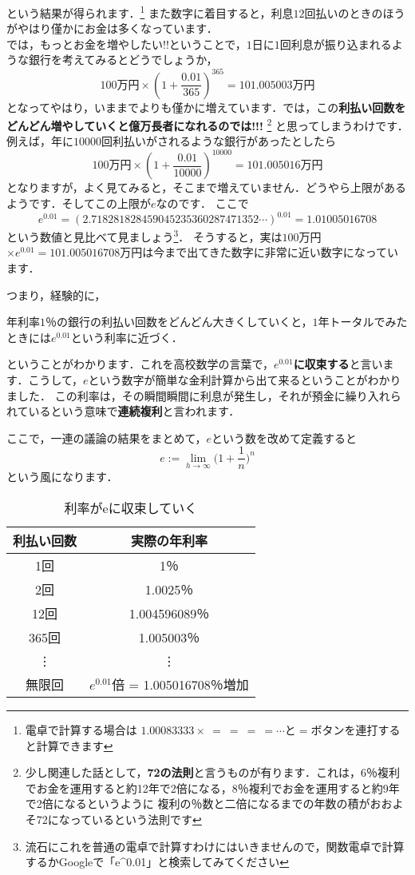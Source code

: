 という結果が得られます．\footnote{電卓で計算する場合は $1.00083333 \times\  = \ = \ = \ = \dotsb $と$=$ボタンを連打すると計算できます}
また数字に着目すると，利息$12$回払いのときのほうがやはり僅かにお金は多くなっています．\\
では，もっとお金を増やしたい!!ということで，$1$日に$1$回利息が振り込まれるような銀行を考えてみるとどうでしょうか，
\[
100\mbox{万円}\times \left(1 + \frac{0.01}{365}\right)^{365} = 101.005003 \mbox{万円}
\]
となってやはり，いままでよりも僅かに増えています．では，この\textbf{利払い回数をどんどん増やしていくと億万長者になれるのでは!!!}
\footnote{少し関連した話として，\textbf{72の法則}と言うものが有ります．これは，6％複利でお金を運用すると約12年で2倍になる，8％複利でお金を運用すると約9年で2倍になるというように
複利の％数と二倍になるまでの年数の積がおおよそ72になっているという法則です}
と思ってしまうわけです．例えば，年に$10000$回利払いがされるような銀行があったとしたら
\[
100\mbox{万円}\times \left(1 + \frac{0.01}{10000}\right)^{10000} = 101.005016 \mbox{万円}
\]
となりますが，よく見てみると，そこまで増えていません．どうやら上限があるようです．そしてこの上限が$e$なのです．
ここで
\[
e^{0.01} = (2.718281828459045235360287471352 \cdots )^{0.01} = 1.01005016708
\]
という数値と見比べて見ましょう\footnote{流石にこれを普通の電卓で計算すわけにはいきませんので，関数電卓で計算するかGoogleで「e\^{}0.01」と検索してみてください}．
そうすると，実は$100$万円$\times e^{0.01} =  101.005016708$万円は今まで出てきた数字に非常に近い数字になっています．

つまり，経験的に，
\begin{center}
年利率$1$％の銀行の利払い回数をどんどん大きくしていくと，$1$年トータルでみたときには$e^{0.01}$という利率に近づく．
\end{center}
ということがわかります．これを高校数学の言葉で，\textbf{$e^{0.01}$に収束する}と言います．こうして，$e$という数字が簡単な金利計算から出て来るということがわかりました．
この利率は，その瞬間瞬間に利息が発生し，それが預金に繰り入れられているという意味で\textbf{連続複利}と言われます．

ここで，一連の議論の結果をまとめて，$e$という数を改めて定義すると
\[
e := \lim_{h \to \infty} \biggl( 1 + \frac{1}{n}\biggl)^n
\]
という風になります．
\begin{table}[hbtp]
  \caption{利率がeに収束していく}
  \label{table:data_type}
  \centering
  \begin{tabular}{c|c}
    \hline
    利払い回数  & 実際の年利率  \\
    \hline \hline
    1回  & 1％ \\
    2回  & 1.0025％ \\
    12回  & 1.004596089％ \\
    365回  &  1.005003％\\
	\vdots & \vdots \\
	無限回 & $e^{0.01}$倍 = 1.005016708％増加\\
    \hline
  \end{tabular}
\end{table}

